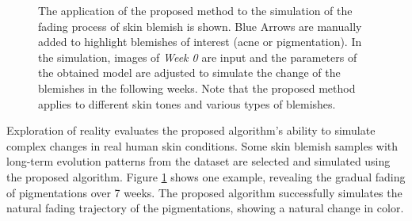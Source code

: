 \begin{spacing}{1.5}
\begin{figure}[t!]
    \caption{The application of the proposed method to the simulation of the fading process of skin blemish is shown. Blue Arrows are manually added to highlight blemishes of interest (acne or pigmentation). In the simulation, images of \textit{Week 0} are input and the parameters of the obtained model are adjusted to simulate the change of the blemishes in the following weeks. Note that the proposed method applies to different skin tones and various types of blemishes.}
    \label{fig:forward}
\end{figure}
Exploration of reality evaluates the proposed algorithm's ability to simulate complex changes in real human skin conditions. Some skin blemish samples with long-term evolution patterns from the dataset are selected and simulated using the proposed algorithm. Figure \ref{fig:forward} shows one example, revealing the gradual fading of pigmentations over 7 weeks. The proposed algorithm successfully simulates the natural fading trajectory of the pigmentations, showing a natural change in color.


\end{spacing}
